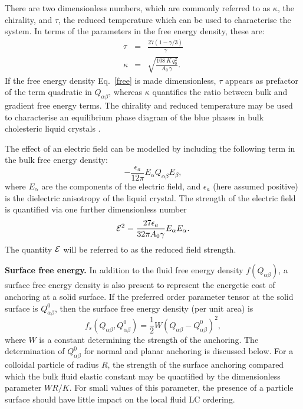 \documentclass[12pt]{article}
\begin{document}
There are two dimensionless numbers, which are commonly referred to as
$\kappa$, the chirality, and  $\tau$, the reduced temperature
\cite{mermin} which can be used to characterise the system. In terms of
the parameters in the free energy density, these are:
\begin{eqnarray}\label{cntrl-param} 
\tau&=&\frac{27(1-\gamma/3)}{\gamma}\label{tau}\\
\kappa&=&\sqrt{\frac{108\ K\, q_0^2}{A_0\, \gamma}}\label{kappa}.
\end{eqnarray}
If the free energy density Eq.~\ref{free} is made dimensionless, $\tau$
appears as prefactor of the term  quadratic in $Q_{\alpha\beta}$,
whereas $\kappa$
quantifies the ratio between bulk and  gradient free energy terms. The
chirality and reduced temperature may be used to characterise an equilibrium
phase diagram of the blue phases in bulk cholesteric liquid crystals
\cite{mermin,henrichfield}.

The effect of an electric field can be modelled by including the following
term in the bulk free energy density:
\begin{equation}
-\frac{\epsilon_a}{12\pi} E_{\alpha}Q_{\alpha\beta}E_{\beta},
\end{equation} 
where $E_{\alpha}$ are the components of the electric field, and 
$\epsilon_a$ (here assumed positive) is the dielectric anisotropy of the liquid
crystal. The strength of the electric field is quantified via
one further dimensionless number
\begin{equation}
{\cal E}^2 = \frac{27 \epsilon_a}{32 \pi A_0 \gamma} E_\alpha E_\alpha.
\end{equation}
The quantity ${\cal E}$ will be referred to as the reduced field strength.


\medskip
\noindent
\textbf{Surface free energy.}
In addition to the fluid free energy density $f(Q_{\alpha\beta})$, a surface
free energy density is also present to represent the energetic cost of
anchoring at a solid surface. If the preferred order parameter tensor
at the solid surface is $Q^0_{\alpha\beta}$, then the surface free energy
density (per unit area) is
\begin{equation}
f_s(Q_{\alpha\beta}, Q^0_{\alpha\beta})
= {\textstyle \frac{1}{2}}W(Q_{\alpha\beta} - Q^0_{\alpha\beta})^2,
\end{equation}
where $W$ is a constant determining the strength of the anchoring.
The determination of $Q^0_{\alpha\beta}$ for normal and planar anchoring is
discussed below. For a colloidal particle of radius $R$, the strength of
the surface
anchoring compared which the bulk fluid elastic constant may be quantified
by the dimensionless parameter $WR/K$. For small values of this parameter,
the presence of a particle surface should have little impact on the local
fluid LC ordering.
\end{document}
